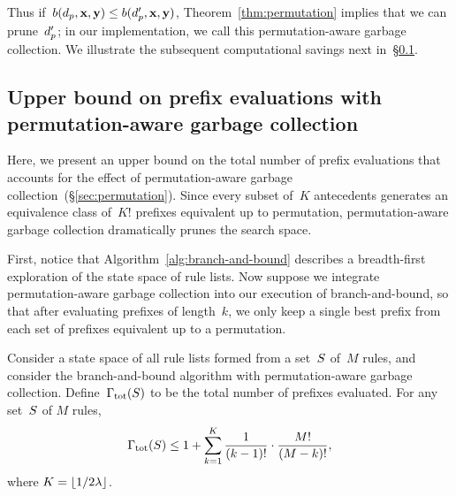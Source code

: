 Thus if~${b(d_p, \mathbf{x}, \mathbf{y}) \le b(d_p', \mathbf{x}, \mathbf{y})}$,
Theorem~\ref{thm:permutation} implies that we can prune~$d_p'$; 
in our implementation, we call this permutation-aware garbage collection.
%
We illustrate the subsequent computational savings next
in~\S\ref{sec:permutation-counting}.

\subsection{Upper bound on prefix evaluations with permutation-aware garbage collection}
\label{sec:permutation-counting}

Here, we present an upper bound on the total number of prefix
evaluations that accounts for the effect of permutation-aware
garbage collection~(\S\ref{sec:permutation}).
%
Since every subset of~$K$ antecedents generates an equivalence
class of~$K!$ prefixes equivalent up to permutation, permutation-aware
garbage collection dramatically prunes the search space.

First, notice that Algorithm~\ref{alg:branch-and-bound} describes a
breadth-first exploration of the state space of rule lists.
%
Now suppose we integrate permutation-aware garbage collection into
our execution of branch-and-bound, so that after evaluating
prefixes of length~$k$, we only keep a single best prefix
from each set of prefixes equivalent up to a permutation.

\begin{theorem}
%
Consider a state space of all rule lists formed from a set~$S$
of~$M$ rules, and consider the branch-and-bound algorithm with
permutation-aware garbage collection.
%
Define~${\Gamma_{\textnormal{tot}}}(S)$ to be the total number of prefixes evaluated.
%
For any set~$S$ of $M$ rules,
\begin{align}
\TotalRemaining(\RuleSet)
\le  1 + \sum_{k=1}^K \frac{1}{(k - 1)!} \cdot \frac{M!}{(M - k)!},
\label{eq:size-naive}
\end{align}
where ${K = \lfloor 1 / 2 {\lambda} \rfloor}$.
\end{theorem}

